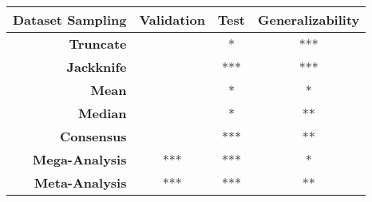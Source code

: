 \begin{tabular}{rccc}
\textbf{Dataset Sampling}  & \textbf{Validation} &      \textbf{Test} & \textbf{Generalizability} \\
\midrule
\textbf{Truncate}          &                     &    {\color{red} *} &                       *** \\
\textbf{Jackknife}         &                     &  {\color{red} ***} &                       *** \\
\textbf{Mean}              &                     &    {\color{red} *} &                         * \\
\textbf{Median}            &                     &    {\color{red} *} &                        ** \\
\textbf{Consensus}         &                     &  {\color{red} ***} &                        ** \\
\textbf{Mega-Analysis}     &                ***  &                *** &                         * \\
\textbf{Meta-Analysis}     &                ***  &                *** &                        ** \\
\end{tabular}
